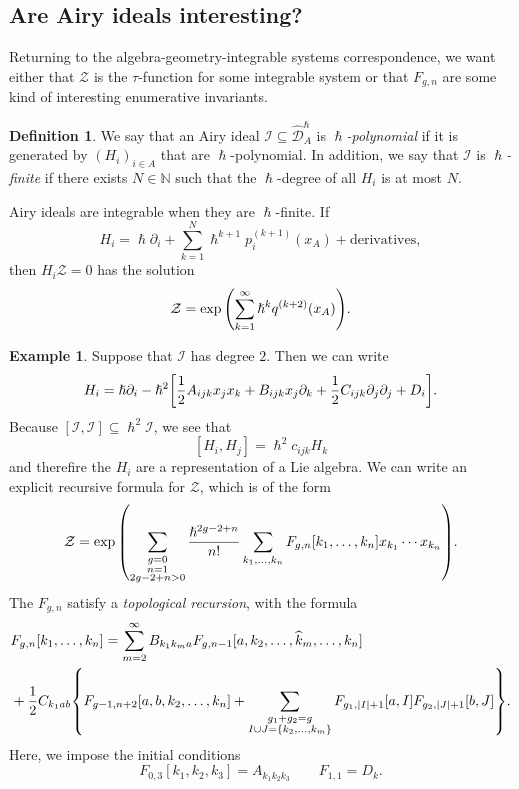 \documentclass{amsart}
\theoremstyle{definition}
\newtheorem{defn}[thm]{Definition}
\newtheorem{exm}[thm]{Example}
\theoremstyle{remark}
\theoremstyle{plain}
\theoremstyle{definition}
\theoremstyle{remark}
\newcommand{\mc}[1]{\mathcal{#1}}
\newcommand{\mr}[1]{\mathrm{#1}}
\newcommand{\wh}[1]{\widehat{#1}}
\newcommand{\1}{\mathbf{1}}
\newcommand{\2}{\mathbf{2}}
\newcommand{\3}{\mathbf{3}}
\begin{document}
\subsection{Are Airy ideals interesting?}

Returning to the algebra-geometry-integrable systems correspondence, we want either that $\mc{Z}$ is the $\tau$-function for some integrable system or that $F_{g,n}$ are some kind of interesting enumerative invariants.

\begin{defn}
    We say that an Airy ideal $\mc{I} \subseteq \wh{\mc{D}}_A^{\hslash}$ is \textit{$\hslash$-polynomial} if it is generated by $(H_i)_{i \in A}$ that are $\hslash$-polynomial. In addition, we say that $\mc{I}$ is \textit{$\hslash$-finite} if there exists $N \in \mathbb{N}$ such that the $\hslash$-degree of all $H_i$ is at most $N$.
\end{defn}

Airy ideals are integrable when they are $\hslash$-finite. If
\[ H_i = \hslash \partial_i + \sum_{k=1}^N \hslash^{k+1} p_i^{(k+1)}(x_A) + \mr{derivatives}, \]
then $H_i \mc{Z} = 0$ has the solution
\[ \mc{Z} = \exp\qty(\sum_{k=1}^{\infty} \hslash^k q^{(k+2)}(x_A)). \]

\begin{exm}
    Suppose that $\mc{I}$ has degree $2$. Then we can write
    \[ H_i = \hslash \partial_i - \hslash^2 \qty[\frac{1}{2} A_{ijk} x_j x_k + B_{ijk} x_j \partial_k + \frac{1}{2} C_{ijk} \partial_j \partial_j + D_i]. \]
    Because $[\mc{I}, \mc{I}] \subseteq \hslash^2 \mc{I}$, we see that
    \[ [H_i, H_j] = \hslash^2 c_{ijk} H_k \]
    and therefire the $H_i$ are a representation of a Lie algebra. We can write an explicit recursive formula for $\mc{Z}$, which is of the form
    \[ \mc{Z} = \exp \qty(\sum_{\substack{g=0 \\ n=1 \\ 2g-2+n > 0}} \frac{\hslash^{2g-2+n}}{n!} \sum_{k_1, \ldots, k_n} F_{g,n}[k_1, \ldots, k_n] x_{k_1} \cdots x_{k_n}). \]
    The $F_{g,n}$ satisfy a \textit{topological recursion}, with the formula
    \begin{align*}
        &F_{g,n}[k_1, \ldots, k_n] = \sum_{m=2}^{\infty} B_{k_1k_ma} F_{g, n-1}[a, k_2, \ldots, \wh{k}_m, \ldots, k_n] \\
        &+ \frac{1}{2} C_{k_1 ab} \qty{F_{g-1,n+2}[a,b,k_2,\ldots,k_n] + \sum_{\substack{g_1+g_2=g \\ I \cup J = \qty{k_2,\ldots,k_m}}} F_{g_1,\abs{I}+1}[a, I] F_{g_2,\abs{J}+1}[b, J]}.
    \end{align*}
    Here, we impose the initial conditions
    \[ F_{0,3}[k_1, k_2, k_3] = A_{k_1 k_2 k_3} \qquad F_{1,1} = D_k. \]
\end{exm}
\end{document}
